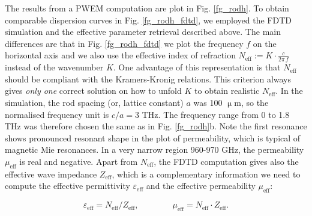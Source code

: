 {{The results from a PWEM computation are plot in Fig. \ref{fg_rodh}. To obtain comparable dispersion curves in Fig. \ref{fg_rodh_fdtd}, we employed the FDTD simulation and the effective parameter retrieval described above. The main differences are that in Fig. \ref{fg_rodh_fdtd} we plot the frequency $f$ on the horizontal axis and we also use the effective index of refraction $N_{\text{eff}} := K\cdot \frac{c}{2\pi\,f}$ instead of the wavenumber $K$. One advantage of this representation is that $N_{\text{eff}}$ should be compliant with the Kramers-Kronig relations. This criterion always gives \textit{only one} correct solution on how to unfold $K$ to obtain realistic $N_{\text{eff}}$. 
In the simulation, the rod spacing (or, lattice constant) $a$ was 100 $\upmu$m, so the normalised frequency unit is $c/a = 3$ THz. The frequency range from 0 to 1.8 THz was therefore chosen the same as in Fig. \ref{fg_rodh}b. 
Note the first resonance shows pronounced resonant shape in the plot of permeability, which is typical of magnetic Mie resonances. In a very narrow region 960-970 GHz, the permeability $\mu_{\text{eff}}$ is real and negative. 
Apart from $N_{\text{eff}}$, the FDTD computation gives also the effective wave impedance $Z_{\text{eff}}$, which is a complementary information we need to compute the effective permittivity $\varepsilon_{\text{eff}}$ and the effective permeability $\mu_{\text{eff}}$:

\begin{equation} \varepsilon_{\text{eff}} = N_{\text{eff}}/Z_{\text{eff}}, \quad\quad\quad\quad \mu_{\text{eff}} = N_{\text{eff}}\cdot Z_{\text{eff}}.
\label{eq_epsmu}\end{equation}

}}
